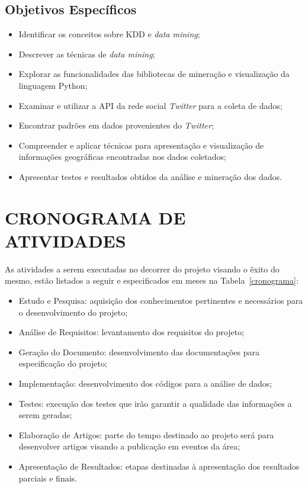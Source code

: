 \subsection{Objetivos Específicos}\label{subsec:objetivos_especificos}
\begin{itemize}
	\item Identificar os conceitos sobre KDD e \textit{data mining};
	\item Descrever as técnicas de \textit{data mining};
	\item Explorar as funcionalidades das bibliotecas de mineração e visualização da linguagem Python;
	\item Examinar e utilizar a API da rede social \textit{Twitter} para a coleta de dados;
	\item Encontrar padrões em dados provenientes do \textit{Twitter};
	\item Compreender e aplicar técnicas para apresentação e visualização de informações geográficas encontradas nos dados coletados;
	\item Apresentar testes e resultados obtidos da análise e mineração dos dados.
\end{itemize}

\section{CRONOGRAMA DE ATIVIDADES}\label{subsec:cronograma}

As atividades a serem executadas no decorrer do projeto visando o êxito do mesmo, estão listados a seguir e especificados em meses na Tabela~\ref{cronograma}:

\begin{itemize}
  \item Estudo e Pesquisa: aquisição dos conhecimentos pertinentes e necessários para o desenvolvimento do projeto;
  \item Análise de Requisitos: levantamento dos requisitos do projeto;
  \item Geração do Documento: desenvolvimento das documentações para especificação do projeto;
  \item Implementação: desenvolvimento dos códigos para a análise de dados;
  \item Testes: execução dos testes que irão garantir a qualidade das informações a serem geradas;
  \item Elaboração de Artigos: parte do tempo destinado ao projeto será para desenvolver artigos visando a publicação em eventos da área;
  \item Apresentação de Resultados: etapas destinadas à apresentação dos resultados parciais e finais.
\end{itemize}


